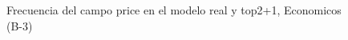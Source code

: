\begin{figure}[H]
    \centering
    
    \caption{Frecuencia del campo  price en el modelo real y top2+1, Economicos (B-3)}
    \label{frecuency- Price-top2+1}
\end{figure}